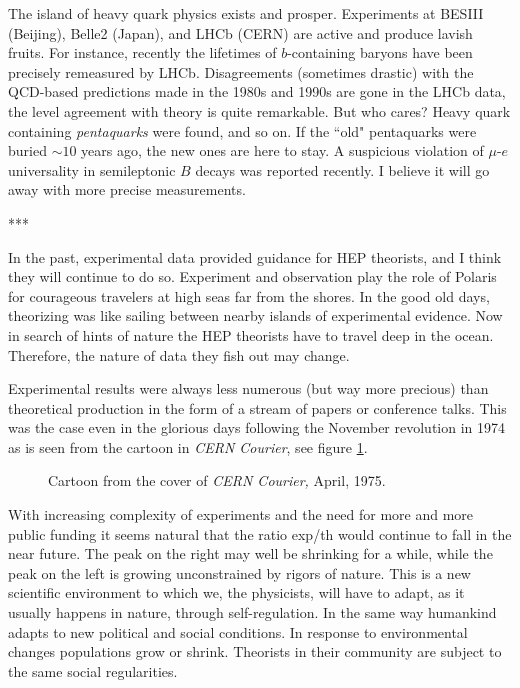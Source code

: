 \documentclass[epsfig,12pt]{article}
\begin{document}
The island of heavy quark physics exists and prosper. Experiments at  BESIII (Beijing),   Belle2  (Japan), and  LHCb (CERN) are active and produce lavish fruits. For instance, recently the lifetimes
of $b$-containing baryons have been precisely remeasured by LHCb. Disagreements (sometimes drastic) with the QCD-based predictions made in the 1980s and 1990s \cite{SV} are gone in the LHCb data,
the level agreement with theory is quite remarkable. But who cares? Heavy quark containing {\em pentaquarks} were found, and so on. If the ``old" pentaquarks were buried $\sim 10$ years ago, the new ones are here to stay. A suspicious violation of $\mu$-$e$ universality in semileptonic $B$ decays was reported recently. I believe it will go away with more precise measurements.
 
\vspace{2mm}

\centerline{***}

In the past, experimental data provided guidance for HEP theorists, and I think they will continue to do so. Experiment  and observation play the role 
of Polaris for courageous travelers at high seas
far from the shores. In the good old days, theorizing was like sailing between nearby islands of
experimental evidence. 
Now in search of hints of nature the HEP theorists have to travel deep in the ocean. Therefore, the nature of data they fish out may change.

Experimental results were always less numerous (but way more precious) than theoretical production in the form of a stream of 
papers or conference talks. This was the case even in the glorious days following the November revolution in 1974 as is seen from the cartoon in {\em CERN Courier}, see figure \ref{figu4ok}.  

\vspace{2mm}

\begin{figure}[h]
\epsfxsize=5.5cm
\centerline{}
\caption{\small
Cartoon from  the cover of {\em CERN Courier,} April, 1975.}
\label{figu4ok}
\end{figure}

With increasing complexity of experiments and the need for more and more public funding it seems natural that the ratio exp/th would continue to fall in the near future.
The peak on the right may well  be shrinking for a while, while the peak on the left is growing unconstrained by rigors of nature.  This is a new scientific environment to which 
we, the physicists,  will have to adapt, as it usually happens in nature, through self-regulation. In the same way humankind adapts to new political and social conditions. In response to environmental changes populations grow or shrink. Theorists in their community are subject to the same social regularities. 
\end{document}
